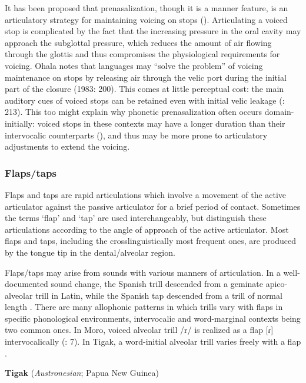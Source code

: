   It has been proposed that prenasalization, though it is a manner feature, is an articulatory strategy for maintaining voicing on stops (\citealt{Ohala1983,HentonEtAl1992}). Articulating a voiced stop is complicated by the fact that the increasing pressure in the oral cavity may approach the subglottal pressure, which reduces the amount of air flowing through the glottis and thus compromises the physiological requirements for voicing. Ohala notes that languages may “solve the problem” of voicing maintenance on stops by releasing air through the velic port during the initial part of the closure (1983: 200). This comes at little perceptual cost: the main auditory cues of voiced stops can be retained even with initial velic leakage (\citealt{OhalaOhala1991}: 213). This too might explain why phonetic prenasalization often occurs domain-initially: voiced stops in these contexts may have a longer duration than their intervocalic counterparts (\citealt{FlegeBrown1982}), and thus may be more prone to articulatory adjustments to extend the voicing.

\subsubsection{{Flaps/taps} }\label{sec:4.5.3.2}

  Flaps and taps are rapid articulations which involve a movement of the active articulator against the passive articulator for a brief period of contact. Sometimes the terms ‘flap’ and ‘tap’ are used interchangeably, but \citet{LadefogedMaddieson1996} distinguish these articulations according to the angle of approach of the active articulator. Most flaps and taps, including the crosslinguistically most frequent ones, are produced by the tongue tip in the dental/alveolar region.

  Flaps/taps may arise from sounds with various manners of articulation. In a well-documented sound change, the Spanish trill descended from a geminate apico-alveolar trill in Latin, while the Spanish tap descended from a trill of normal length \citep[17-18]{Hualde2004}. There are many allophonic patterns in which trills vary with flaps in specific phonological environments, intervocalic and word-marginal contexts being two common ones. In Moro, voiced alveolar trill /r/ is realized as a flap [ɾ] intervocalically (\citealt{BlackBlack1971}: 7). In Tigak, a word-initial alveolar trill varies freely with a flap .

\ea\label{ex:4.52}
  \textbf{Tigak} (\textit{Austronesian}; Papua New Guinea)

